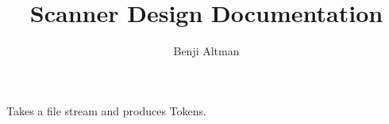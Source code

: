 \documentclass{article}
\author{Benji Altman}
\title{Scanner Design Documentation}
\begin{document}
\maketitle

Takes a file stream and produces Tokens. 
\end{document}
